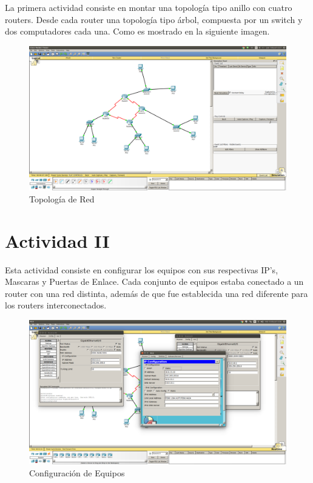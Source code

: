 \documentclass[spanish]{udpreport}
\begin{document}
La primera actividad consiste en montar una topología tipo anillo con cuatro routers. Desde cada router una topología tipo árbol, compuesta por un switch y dos computadores cada una. Como es mostrado en la siguiente imagen.

\begin{figure}[H]
	\centering
	\includegraphics[scale=.25]{imagenes/red.png}
	\caption{Topología de Red}
	\label{fig:Figura 2.1}
\end{figure}

\section{Actividad II}

Esta actividad consiste en configurar los equipos con sus respectivas IP's, Mascaras y Puertas de Enlace. Cada conjunto de equipos estaba conectado a un router con una red distinta, además de que fue establecida una red diferente para los routers interconectados.

\begin{figure}[H]
	\centering
	\includegraphics[scale=.25]{imagenes/ips.png}
	\caption{Configuración de Equipos}
	\label{fig:Figura 3.1}
\end{figure}
\end{document}
